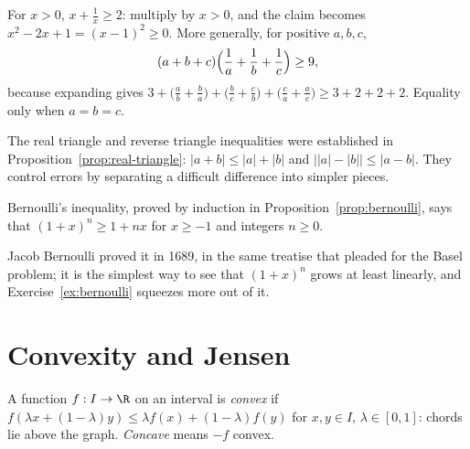 \begin{examplex}
For $x>0$, $x+\frac1x\ge2$: multiply by $x>0$, and the claim becomes $x^2-2x+1=(x-1)^2\ge0$. More generally, for positive $a,b,c$,
\[
(a+b+c)\Bigl(\frac1a+\frac1b+\frac1c\Bigr)\ge9,
\]
because expanding gives $3+\bigl(\frac ab+\frac ba\bigr)+\bigl(\frac bc+\frac cb\bigr)+\bigl(\frac ca+\frac ac\bigr)\ge3+2+2+2$. Equality only when $a=b=c$.
\end{examplex}

The real triangle and reverse triangle inequalities were established in
Proposition~\ref{prop:real-triangle}:
$|a+b|\le|a|+|b|$ and $\bigl||a|-|b|\bigr|\le|a-b|$.
They control errors by separating a difficult difference into simpler pieces.

Bernoulli's inequality, proved by induction in
Proposition~\ref{prop:bernoulli}, says that $(1+x)^n\ge1+nx$ for $x\ge-1$
and integers $n\ge0$.

Jacob Bernoulli proved it in 1689, in the same treatise that pleaded for the Basel problem; it is the simplest way to see that $(1+x)^n$ grows at least
linearly, and Exercise~\ref{ex:bernoulli} squeezes more out of it.

\section{Convexity and Jensen}

A function $f:I\to\R$ on an interval is \emph{convex} if $f(\lambda x+(1-\lambda)y)\le\lambda f(x)+(1-\lambda)f(y)$ for $x,y\in I$, $\lambda\in[0,1]$:
chords lie above the graph. \emph{Concave} means $-f$ convex.

